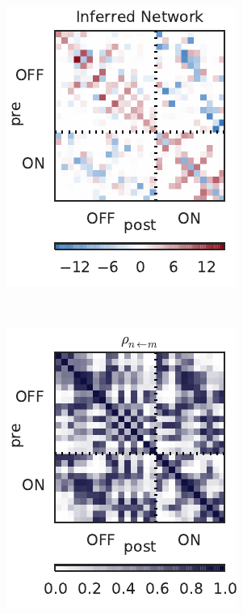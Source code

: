 \begin{figure}[t!]
\begin{subfigure}[b]{1.85in}
    \includegraphics[width=\textwidth]{figures/ch5/rgc_connectivity.pdf}
    \label{fig:rgc_w}
  \end{subfigure}
  ~
    \begin{subfigure}[b]{1.85in}
    \centering
    \caption{}
    \vspace{-.2in}
    \includegraphics[width=\textwidth]{figures/ch5/rgc_prob_conn.pdf}

\end{subfigure}
\end{figure}
